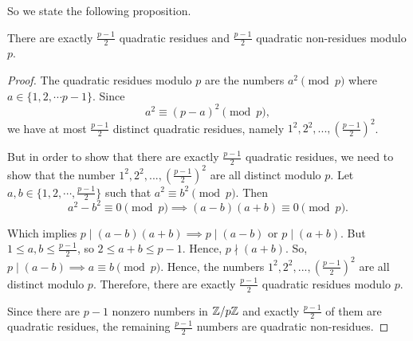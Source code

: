 So we state the following proposition.
\begin{prop}[\# of QR/QNR]
    There are exactly $\frac{p-1}{2}$ quadratic residues and $\frac{p-1}{2}$ quadratic non-residues modulo $p$.
\end{prop}
\begin{proof}
    The quadratic residues modulo $p$ are the numbers $a^2 \pmod{p}$ where $a \in \{1, 2, \cdots p-1\}$. Since \[a^2 \equiv (p-a)^2 \pmod{p},\] we have at most $\frac{p-1}{2}$ distinct quadratic residues, namely $1^2, 2^2, ..., \left(\frac{p-1}{2}\right)^2$.

    But in order to show that there are exactly $\frac{p-1}{2}$ quadratic residues, we need to show that the number $1^2, 2^2, ..., \left(\frac{p-1}{2}\right)^2$ are all distinct modulo $p$. Let $a, b \in \{1, 2, \cdots, \frac{p-1}{2}\}$ such that $a^2 \equiv b^2 \pmod{p}$. Then \[a^2 - b^2 \equiv 0 \pmod{p} \implies (a-b)(a+b) \equiv 0 \pmod{p}.\]

    Which implies $p \mid (a-b)(a+b) \implies p \mid (a-b)$ or $p \mid (a+b)$. But $1 \le a, b \le \frac{p-1}{2}$, so $2 \le a+b \le p-1$. Hence, $p \nmid (a+b)$. So, $p \mid (a-b) \implies a \equiv b \pmod{p}$. Hence, the numbers $1^2, 2^2, ..., \left(\frac{p-1}{2}\right)^2$ are all distinct modulo $p$. Therefore, there are exactly $\frac{p-1}{2}$ quadratic residues modulo $p$.

    Since there are $p-1$ nonzero numbers in $\mathbb{Z}/p\mathbb{Z}$ and exactly $\frac{p-1}{2}$ of them are quadratic residues, the remaining $\frac{p-1}{2}$ numbers are quadratic non-residues.
\end{proof}